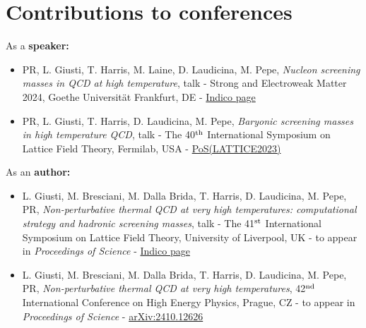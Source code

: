 \documentclass{report}
\begin{document}
\section*{Contributions to conferences}
As a \textbf{speaker:}
\begin{itemize}
\item PR, L. Giusti, T. Harris, M. Laine, D. Laudicina, M. Pepe, \textit{Nucleon screening 
masses in QCD at high temperature}, talk - Strong and
Electroweak Matter 2024, Goethe Universit\"at Frankfurt, DE - \href{https://indico.physik.uni-bielefeld.de/event/100/contributions/226/}{Indico page} \\
\item PR, L. Giusti, T. Harris, D. Laudicina, M. Pepe, \textit{Baryonic screening masses in 
high temperature QCD}, talk -
The 40$^{\rm th}$ International Symposium on Lattice Field Theory, Fermilab, USA - \href{https://pos.sissa.it/453/196/}{PoS(LATTICE2023)}
\end{itemize}
As an \textbf{author:}
\begin{itemize}
    \item L. Giusti, M. Bresciani, M. Dalla Brida, T. Harris, D. Laudicina, M. Pepe,
    PR, \textit{Non-perturbative thermal QCD at very high temperatures: computational strategy and hadronic screening masses}, talk - The 41$^{\rm st}$ International Symposium on Lattice Field Theory, University of Liverpool, UK - to appear in 
    \textit{Proceedings of Science} - \href{https://conference.ippp.dur.ac.uk/event/1265/contributions/7291/}{Indico page}
    \item L. Giusti, M. Bresciani, M. Dalla Brida, T. Harris, D. Laudicina, M. Pepe,
    PR, \textit{Non-perturbative thermal QCD at 
    very high temperatures}, 
    42$^{\rm nd}$ International Conference on High Energy Physics, Prague, CZ - to appear in \textit{Proceedings
    of Science} - \href{https://arxiv.org/abs/2410.12626}{arXiv:2410.12626}
\end{itemize}
\tableofcontents
\pagestyle{mystyle}














\appendix


\printbibliography


\end{document}
